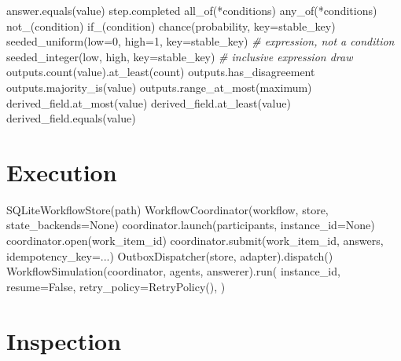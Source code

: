 \documentclass[
  10pt,
]{report}
\newenvironment{Shaded}{}{}
\newcommand{\BuiltInTok}[1]{\textcolor[rgb]{0.00,0.50,0.00}{#1}}
\newcommand{\CommentTok}[1]{\textcolor[rgb]{0.38,0.63,0.69}{\textit{#1}}}
\newcommand{\DecValTok}[1]{\textcolor[rgb]{0.25,0.63,0.44}{#1}}
\newcommand{\NormalTok}[1]{#1}
\newcommand{\OperatorTok}[1]{\textcolor[rgb]{0.40,0.40,0.40}{#1}}
\newcommand{\VariableTok}[1]{\textcolor[rgb]{0.10,0.09,0.49}{#1}}
\begin{document}
\begin{Shaded}
\begin{Highlighting}[]
\NormalTok{answer.equals(value)}
\NormalTok{step.completed}
\NormalTok{all\_of(}\OperatorTok{*}\NormalTok{conditions)}
\NormalTok{any\_of(}\OperatorTok{*}\NormalTok{conditions)}
\NormalTok{not\_(condition)}
\NormalTok{if\_(condition)}
\NormalTok{chance(probability, key}\OperatorTok{=}\NormalTok{stable\_key)}
\NormalTok{seeded\_uniform(low}\OperatorTok{=}\DecValTok{0}\NormalTok{, high}\OperatorTok{=}\DecValTok{1}\NormalTok{, key}\OperatorTok{=}\NormalTok{stable\_key)  }\CommentTok{\# expression, not a condition}
\NormalTok{seeded\_integer(low, high, key}\OperatorTok{=}\NormalTok{stable\_key)       }\CommentTok{\# inclusive expression draw}
\NormalTok{outputs.count(value).at\_least(count)}
\NormalTok{outputs.has\_disagreement}
\NormalTok{outputs.majority\_is(value)}
\NormalTok{outputs.range\_at\_most(maximum)}
\NormalTok{derived\_field.at\_most(value)}
\NormalTok{derived\_field.at\_least(value)}
\NormalTok{derived\_field.equals(value)}
\end{Highlighting}
\end{Shaded}

\section{Execution}\label{execution}

\begin{Shaded}
\begin{Highlighting}[]
\NormalTok{SQLiteWorkflowStore(path)}
\NormalTok{WorkflowCoordinator(workflow, store, state\_backends}\OperatorTok{=}\VariableTok{None}\NormalTok{)}
\NormalTok{coordinator.launch(participants, instance\_id}\OperatorTok{=}\VariableTok{None}\NormalTok{)}
\NormalTok{coordinator.}\BuiltInTok{open}\NormalTok{(work\_item\_id)}
\NormalTok{coordinator.submit(work\_item\_id, answers, idempotency\_key}\OperatorTok{=}\NormalTok{...)}
\NormalTok{OutboxDispatcher(store, adapter).dispatch()}
\NormalTok{WorkflowSimulation(coordinator, agents, answerer).run(}
\NormalTok{    instance\_id,}
\NormalTok{    resume}\OperatorTok{=}\VariableTok{False}\NormalTok{,}
\NormalTok{    retry\_policy}\OperatorTok{=}\NormalTok{RetryPolicy(),}
\NormalTok{)}
\end{Highlighting}
\end{Shaded}

\section{Inspection}\label{inspection}
\end{document}
